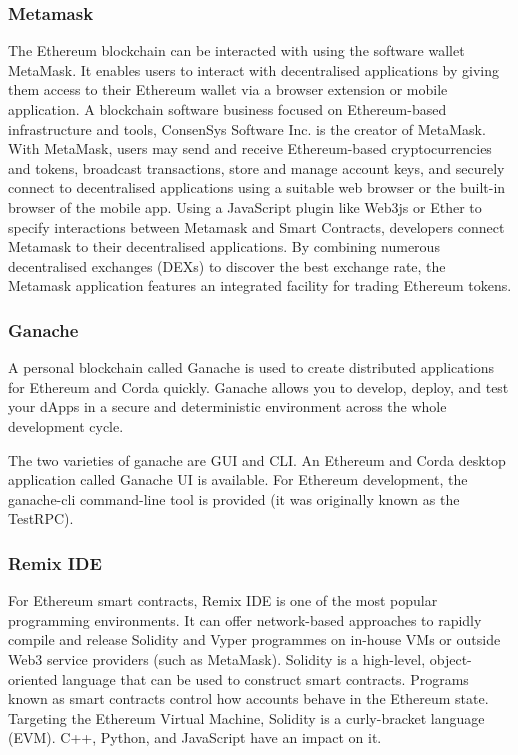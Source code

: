 \documentclass[12pt,a4paper,twocolumn,fleqn]{article}
\begin{document}
\subsubsection{Metamask}
The Ethereum blockchain can be interacted with using the software wallet MetaMask. It enables users to interact with decentralised applications by giving them access to their Ethereum wallet via a browser extension or mobile application. A blockchain software business focused on Ethereum-based infrastructure and tools, ConsenSys Software Inc. is the creator of MetaMask. With MetaMask, users may send and receive Ethereum-based cryptocurrencies and tokens, broadcast transactions, store and manage account keys, and securely connect to decentralised applications using a suitable web browser or the built-in browser of the mobile app. Using a JavaScript plugin like Web3js or Ether to specify interactions between Metamask and Smart Contracts, developers connect Metamask to their decentralised applications. By combining numerous decentralised exchanges (DEXs) to discover the best exchange rate, the Metamask application features an integrated facility for trading Ethereum tokens.
\subsubsection{Ganache}
A personal blockchain called Ganache is used to create distributed applications for Ethereum and Corda quickly. Ganache allows you to develop, deploy, and test your dApps in a secure and deterministic environment across the whole development cycle. 

The two varieties of ganache are GUI and CLI. An Ethereum and Corda desktop application called Ganache UI is available. For Ethereum development, the ganache-cli command-line tool is provided (it was originally known as the TestRPC). 
\subsubsection{Remix IDE}
For Ethereum smart contracts, Remix IDE is one of the most popular programming environments. It can offer network-based approaches to rapidly compile and release Solidity and Vyper programmes on in-house VMs or outside Web3 service providers (such as MetaMask).
Solidity is a high-level, object-oriented language that can be used to construct smart contracts. Programs known as smart contracts control how accounts behave in the Ethereum state. Targeting the Ethereum Virtual Machine, Solidity is a curly-bracket language (EVM). C++, Python, and JavaScript have an impact on it. 
\end{document}
